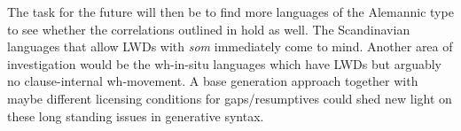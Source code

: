 \documentclass[output=paper]{langsci/langscibook}
\begin{document}
The task for the future will then be to find more languages of the Alemannic
type to see whether the correlations outlined in  hold as
well. The Scandinavian languages that allow \glspl{LWD} with \emph{som}
immediately come to mind. Another area of investigation would be the wh-in-situ
languages which have \glspl{LWD} but arguably no clause-internal wh-movement. A
base generation approach together with maybe different licensing conditions for
gaps/resumptives could shed new light on these long
standing issues in generative syntax.



\printchapterglossary{}

{\sloppy\printbibliography[heading=subbibliography,notkeyword=this]}
\end{document}
